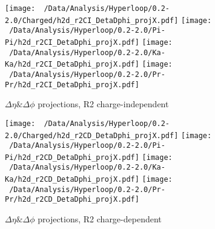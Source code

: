 \documentclass[ALICE,manyauthors]{ALICE_analysis_notes}
\begin{document}
\begin{figure}[H]
	\hfill
	\centering
	\texttt{[image: ~/Data/Analysis/Hyperloop/0.2-2.0/Charged/h2d\_r2CI\_DetaDphi\_projX.pdf]}
	\texttt{[image: ~/Data/Analysis/Hyperloop/0.2-2.0/Pi-Pi/h2d\_r2CI\_DetaDphi\_projX.pdf]}
	\texttt{[image: ~/Data/Analysis/Hyperloop/0.2-2.0/Ka-Ka/h2d\_r2CI\_DetaDphi\_projX.pdf]}
	\texttt{[image: ~/Data/Analysis/Hyperloop/0.2-2.0/Pr-Pr/h2d\_r2CI\_DetaDphi\_projX.pdf]}
	\\
	\hfill
	\caption{$\Delta\eta\&\Delta\phi$ projections, R2 charge-independent}
\end{figure}
\begin{figure}[H]
	\hfill
	\centering
	\texttt{[image: ~/Data/Analysis/Hyperloop/0.2-2.0/Charged/h2d\_r2CD\_DetaDphi\_projX.pdf]}
	\texttt{[image: ~/Data/Analysis/Hyperloop/0.2-2.0/Pi-Pi/h2d\_r2CD\_DetaDphi\_projX.pdf]}
	\texttt{[image: ~/Data/Analysis/Hyperloop/0.2-2.0/Ka-Ka/h2d\_r2CD\_DetaDphi\_projX.pdf]}
	\texttt{[image: ~/Data/Analysis/Hyperloop/0.2-2.0/Pr-Pr/h2d\_r2CD\_DetaDphi\_projX.pdf]}
	\\
	\hfill
	\caption{$\Delta\eta\&\Delta\phi$ projections, R2 charge-dependent}
\end{figure}
\end{document}
